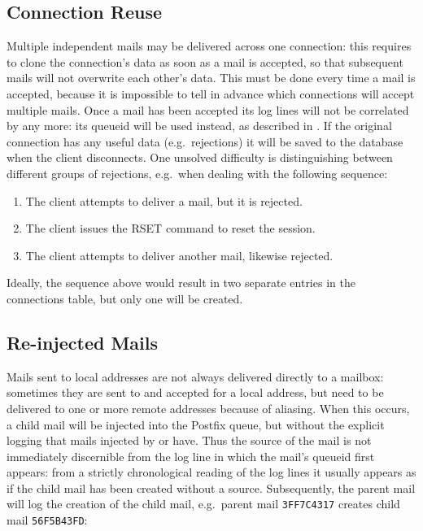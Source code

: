 \subsection{Connection Reuse}

\label{connection reuse}

Multiple independent mails may be delivered across one connection: this
requires \parsername{} to clone the connection's data as soon as a mail is
accepted, so that subsequent mails will not overwrite each other's data.
This must be done every time a mail is accepted, because it is impossible
to tell in advance which connections will accept multiple mails.  Once a
mail has been accepted its log lines will not be correlated by
 any more: its queueid will be used instead, as described in
.  If the original connection has any useful
data (e.g.\ rejections) it will be saved to the database when the client
disconnects.  One unsolved difficulty is distinguishing between different
groups of rejections, e.g.\ when dealing with the following sequence:

\begin{enumerate}

    \squeezeitems{}

    \item The client attempts to deliver a mail, but it is rejected.

    \item The client issues the RSET command to reset the 
        session.

    \item The client attempts to deliver another mail, likewise rejected.

\end{enumerate}

Ideally, the sequence above would result in two separate entries in the
connections table, but only one will be created.



\subsection{Re-injected Mails}

\label{Re-injected mails}

\label{tracking re-injected mail}

Mails sent to local addresses are not always delivered directly to a
mailbox: sometimes they are sent to and accepted for a local address, but
need to be delivered to one or more remote addresses because of aliasing.
When this occurs, a child mail will be injected into the Postfix queue, but
without the explicit logging that mails injected by  or
 have.  Thus the source of the mail is not immediately
discernible from the log line in which the mail's queueid first appears:
from a strictly chronological reading of the log lines it usually appears
as if the child mail has been created without a source.  Subsequently, the
parent mail will log the creation of the child mail, e.g.\ parent mail
\texttt{3FF7C4317} creates child mail \texttt{56F5B43FD}\@:

